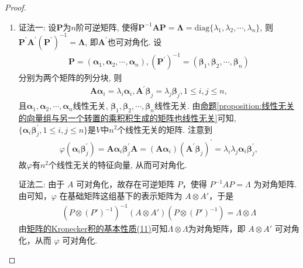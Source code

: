 \documentclass[../../main.tex]{subfiles}
\begin{document}
\begin{proof}
\begin{enumerate}
\item {\color{blue}证法一:}
设\(\boldsymbol{P}\)为\(n\)阶可逆矩阵, 使得\(\boldsymbol{P}^{-1}\boldsymbol{AP}=\boldsymbol{\Lambda}=\mathrm{diag}\{\lambda_{1},\lambda_{2},\cdots,\lambda_{n}\}\), 则\(\boldsymbol{P}^{\prime}\boldsymbol{A}^{\prime}(\boldsymbol{P}^{\prime})^{-1}=\boldsymbol{\Lambda}\), 即\(\boldsymbol{A}^{\prime}\)也可对角化. 设
\begin{align*}
\boldsymbol{P}=(\boldsymbol{\alpha}_{1},\boldsymbol{\alpha}_{2},\cdots,\boldsymbol{\alpha}_{n}), (\boldsymbol{P}^{\prime})^{-1}=(\boldsymbol{\beta}_{1},\boldsymbol{\beta}_{2},\cdots,\boldsymbol{\beta}_{n})
\end{align*}
分别为两个矩阵的列分块, 则
\begin{align*}
\boldsymbol{A}\boldsymbol{\alpha}_{i}=\lambda_{i}\boldsymbol{\alpha}_{i}, \boldsymbol{A}^{\prime}\boldsymbol{\beta}_{j}=\lambda_{j}\boldsymbol{\beta}_{j}, 1\leqslant  i,j\leqslant  n,
\end{align*}
且\(\boldsymbol{\alpha}_{1},\boldsymbol{\alpha}_{2},\cdots,\boldsymbol{\alpha}_{n}\)线性无关, \(\boldsymbol{\beta}_{1},\boldsymbol{\beta}_{2},\cdots,\boldsymbol{\beta}_{n}\)线性无关. 由\hyperref[proposition:线性无关的向量组与另一个转置的乘积积生成的矩阵也线性无关]{命题\ref{proposition:线性无关的向量组与另一个转置的乘积积生成的矩阵也线性无关}}可知, \(\{\boldsymbol{\alpha}_{i}\boldsymbol{\beta}_{j}^{\prime},1\leqslant  i,j\leqslant  n\}\)是\(V\)中\(n^{2}\)个线性无关的矩阵. 注意到
\begin{align*}
\varphi(\boldsymbol{\alpha}_{i}\boldsymbol{\beta}_{j}^{\prime})=\boldsymbol{A}\boldsymbol{\alpha}_{i}\boldsymbol{\beta}_{j}^{\prime}\boldsymbol{A}=(\boldsymbol{A}\boldsymbol{\alpha}_{i})(\boldsymbol{A}^{\prime}\boldsymbol{\beta}_{j})^{\prime}=\lambda_{i}\lambda_{j}\boldsymbol{\alpha}_{i}\boldsymbol{\beta}_{j}^{\prime},
\end{align*}
故\(\varphi\)有\(n^{2}\)个线性无关的特征向量, 从而可对角化. 

{\color{blue}证法二:}
由于 $A$ 可对角化，故存在可逆矩阵 $P$，使得 $P^{-1}AP = \varLambda$ 为对角矩阵. 由可知，$\varphi$ 在基础矩阵这组基下的表示矩阵为 $A\otimes A'$，于是
\begin{align*}
(P\otimes (P')^{-1})^{-1}(A\otimes A')(P\otimes (P')^{-1})=\varLambda\otimes\varLambda
\end{align*}
由\hyperref[矩阵的Kronecker积的基本性质(11)]{矩阵的Kronecker积的基本性质(11)}可知$\varLambda\otimes\varLambda$为对角矩阵，即 $A\otimes A'$ 可对角化，从而 $\varphi$ 可对角化. 


\end{enumerate}
\end{proof}
\end{document}
